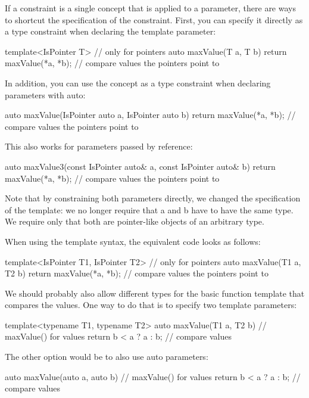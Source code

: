 If a constraint is a single concept that is applied to a parameter, there are ways to shortcut the specification of the constraint. First, you can specify it directly as a type constraint when declaring the template parameter:

\begin{cpp}
template<IsPointer T> // only for pointers
auto maxValue(T a, T b)
{
	return maxValue(*a, *b); // compare values the pointers point to
}
\end{cpp}

In addition, you can use the concept as a type constraint when declaring parameters with auto:

\begin{cpp}
auto maxValue(IsPointer auto a, IsPointer auto b)
{
	return maxValue(*a, *b); // compare values the pointers point to
}
\end{cpp}

This also works for parameters passed by reference:

\begin{cpp}
auto maxValue3(const IsPointer auto& a, const IsPointer auto& b)
{
	return maxValue(*a, *b); // compare values the pointers point to
}
\end{cpp}

Note that by constraining both parameters directly, we changed the specification of the template: we no longer require that a and b have to have the same type. We require only that both are pointer-like objects of an arbitrary type.

When using the template syntax, the equivalent code looks as follows:

\begin{cpp}
template<IsPointer T1, IsPointer T2> // only for pointers
auto maxValue(T1 a, T2 b)
{
	return maxValue(*a, *b); // compare values the pointers point to
}
\end{cpp}

We should probably also allow different types for the basic function template that compares the values. One way to do that is to specify two template parameters:

\begin{cpp}
template<typename T1, typename T2>
auto maxValue(T1 a, T2 b) // maxValue() for values
{
	return b < a ? a : b; // compare values
}
\end{cpp}

The other option would be to also use auto parameters:

\begin{cpp}
auto maxValue(auto a, auto b) // maxValue() for values
{
	return b < a ? a : b; // compare values
}
\end{cpp}

